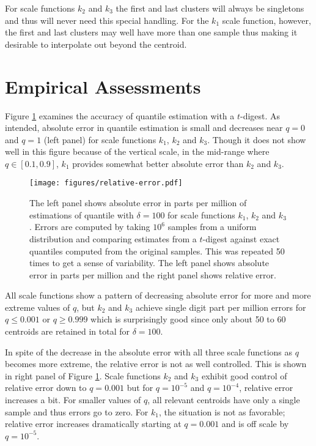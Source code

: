 \documentclass[]{statsoc}
\begin{document}
For scale functions $k_2$ and $k_3$ the first and last clusters will always be singletons and thus will never need this special handling. For the $k_1$ scale function, however, the first and last clusters may well have more than one sample thus making it desirable to interpolate out beyond the centroid. 

\section{Empirical Assessments}
Figure \ref{fig:by-scale} examines the accuracy of quantile estimation with a $t$-digest.  As intended, absolute error in quantile estimation is small and decreases near $q=0$ and $q=1$ (left panel) for scale functions $k_1$, $k_2$ and $k_3$. Though it does not show well in this figure because of the vertical scale, in the mid-range where $q \in [0.1, 0.9]$, $k_1$ provides somewhat better absolute error than $k_2$ and $k_3$. 
\begin{figure}[htb] %
   \texttt{[image: figures/relative-error.pdf]} 
   \caption{The left panel shows absolute error in parts per million of estimations of quantile with $\delta = 100$ for scale functions $k_1$, $k_2$ and $k_3$. Errors are computed by taking $10^6$ samples from a uniform distribution and comparing estimates from a $t$-digest against exact quantiles computed from the original samples. This was repeated 50 times to get a sense of variability. The left panel shows absolute error in parts per million and the right panel shows relative error.}
   \label{fig:by-scale}
\end{figure}

All scale functions show a pattern of decreasing absolute error for more and more extreme values of $q$, but $k_2$ and $k_3$ achieve single digit part per million errors for $q\le 0.001$ or $q\ge0.999$ which is surprisingly good since only about 50 to 60 centroids are retained in total for $\delta=100$. 

In spite of the decrease in the absolute error with all three scale functions as $q$ becomes more extreme, the relative error is not as well controlled. This is shown in right panel of Figure \ref{fig:by-scale}. Scale functions $k_2$ and $k_3$ exhibit good control of relative error down to $q=0.001$ but for $q= 10^{-5}$ and $q=10^{-4}$, relative error increases a bit. For  smaller values of $q$, all relevant centroids have only a single sample and thus errors go to zero. For $k_1$, the situation is not as favorable; relative error increases dramatically starting at $q=0.001$ and is off scale by $q=10^{-5}$.
\end{document}
